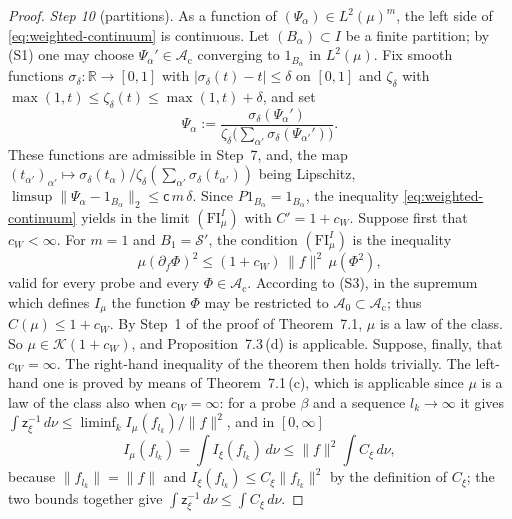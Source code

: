 \documentclass[11pt]{amsart}
\theoremstyle{definition}
\begin{document}
\begin{proof}
\emph{Step 10} (partitions).
As a function of $(\Psi_\alpha)\in L^2(\mu)^m$, the left side of \eqref{eq:weighted-continuum} is continuous.
Let $(B_\alpha)\subset I$ be a finite partition; by (S1) one may choose $\Psi_\alpha'\in\mathcal A_{\mathrm c}$ converging to $1_{B_\alpha}$ in $L^2(\mu)$.
Fix smooth functions $\sigma_\delta\colon\mathbb R\to[0,1]$ with $|\sigma_\delta(t)-t|\le\delta$ on $[0,1]$ and $\zeta_\delta$ with $\max(1,t)\le\zeta_\delta(t)\le\max(1,t)+\delta$, and set
\begin{equation*}
\Psi_\alpha:=\frac{\sigma_\delta(\Psi_\alpha')}{\zeta_\delta\bigl(\sum_{\alpha'}\sigma_\delta(\Psi_{\alpha'}')\bigr)}.
\end{equation*}
These functions are admissible in Step~7, and, the map $(t_{\alpha'})_{\alpha'}\mapsto\sigma_\delta(t_\alpha)/\zeta_\delta(\sum_{\alpha'}\sigma_\delta(t_{\alpha'}))$ being Lipschitz, $\limsup\|\Psi_\alpha-1_{B_\alpha}\|_2\le\mathsf c\,m\,\delta$.
Since $P1_{B_\alpha}=1_{B_\alpha}$, the inequality \eqref{eq:weighted-continuum} yields in the limit $(\mathrm{FI}^I_\mu)$ with $C'=1+c_W$.
Suppose first that $c_W<\infty$.
For $m=1$ and $B_1=\mathcal S'$, the condition $(\mathrm{FI}^I_\mu)$ is the inequality
\begin{equation*}
\mu(\partial_f\Phi)^2\le(1+c_W)\,\|f\|^2\,\mu(\Phi^2),
\end{equation*}
valid for every probe and every $\Phi\in\mathcal A_{\mathrm c}$.
According to (S3), in the supremum which defines $I_\mu$ the function $\Phi$ may be restricted to $\mathcal A_0\subset\mathcal A_{\mathrm c}$; thus $C(\mu)\le1+c_W$.
By Step~1 of the proof of Theorem~7.1, $\mu$ is a law of the class.
So $\mu\in\mathcal K(1+c_W)$, and Proposition~7.3\,(d) is applicable.
Suppose, finally, that $c_W=\infty$.
The right-hand inequality of the theorem then holds trivially.
The left-hand one is proved by means of Theorem~7.1\,(c), which is applicable since $\mu$ is a law of the class also when $c_W=\infty$:
for a probe $\beta$ and a sequence $l_k\to\infty$ it gives $\int\mathsf z_\xi^{-1}\,d\nu\le\liminf_kI_\mu(f_{l_k})/\|f\|^2$,
and in $[0,\infty]$
\begin{equation*}
I_\mu(f_{l_k})=\int I_\xi(f_{l_k})\,d\nu\le\|f\|^2\int C_\xi\,d\nu,
\end{equation*}
because $\|f_{l_k}\|=\|f\|$ and $I_\xi(f_{l_k})\le C_\xi\|f_{l_k}\|^2$ by the definition of $C_\xi$;
the two bounds together give $\int\mathsf z_\xi^{-1}\,d\nu\le\int C_\xi\,d\nu$.


\end{proof}
\end{document}
